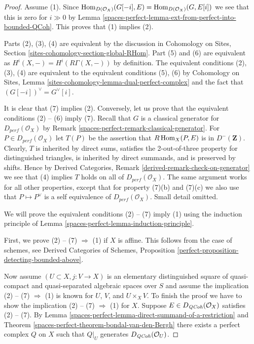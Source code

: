 \begin{proof}
Assume (1). Since
$\operatorname{Hom}_{D(\mathcal{O}_X)}(G[-i], E) = \operatorname{Hom}_{D(\mathcal{O}_X)}(G, E[i])$
we see that this is zero for $i \gg 0$ by
Lemma \ref{spaces-perfect-lemma-ext-from-perfect-into-bounded-QCoh}. This proves
that (1) implies (2).

\medskip\noindent
Parts (2), (3), (4) are equivalent by the discussion in
Cohomology on Sites, Section \ref{sites-cohomology-section-global-RHom}.
Part (5) and (6) are equivalent as $H^i(X, -) = H^i(R\Gamma(X, -))$
by definition. The equivalent conditions (2), (3), (4) are
equivalent to the equivalent conditions (5), (6) by
Cohomology on Sites, Lemma \ref{sites-cohomology-lemma-dual-perfect-complex}
and the fact that $(G[-i])^\vee = G^\vee[i]$.

\medskip\noindent
It is clear that (7) implies (2). Conversely,
let us prove that the equivalent conditions (2) -- (6) imply (7).
Recall that $G$ is a  classical generator for $D_{perf}(\mathcal{O}_X)$ by
Remark \ref{spaces-perfect-remark-classical-generator}.
For $P \in D_{perf}(\mathcal{O}_X)$ let $T(P)$ be the assertion that
$R\operatorname{Hom}_X(P, E)$ is in $D^-(\mathbf{Z})$.
Clearly, $T$ is inherited by direct sums,
satisfies the 2-out-of-three property for distinguished
triangles, is inherited by direct summands, and is preserved by shifts.
Hence by Derived Categories, Remark \ref{derived-remark-check-on-generator}
we see that (4) implies $T$ holds on all of $D_{perf}(\mathcal{O}_X)$.
The same argument works for all other properties, except that for property
(7)(b) and (7)(c) we also use that $P \mapsto P^\vee$ is a self
equivalence of $D_{perf}(\mathcal{O}_X)$. Small detail omitted.

\medskip\noindent
We will prove the equivalent conditions (2) -- (7) imply (1)
using the induction principle of
Lemma \ref{spaces-perfect-lemma-induction-principle}.

\medskip\noindent
First, we prove (2) -- (7) $\Rightarrow$ (1) if $X$ is affine.
This follows from the case of schemes, see
Derived Categories of Schemes, Proposition
\ref{perfect-proposition-detecting-bounded-above}.

\medskip\noindent
Now assume $(U \subset X, j : V \to X)$ is an elementary distinguished
square of quasi-compact and quasi-separated algebraic spaces over $S$
and assume the implication (2) -- (7) $\Rightarrow$ (1)
is known for $U$, $V$, and $U \times_X V$. To finish the proof
we have to show the implication (2) -- (7) $\Rightarrow$ (1) for $X$.
Suppose $E \in D_{\mathit{QCoh}}(\mathcal{O}_X)$ satisfies (2) -- (7).
By Lemma \ref{spaces-perfect-lemma-direct-summand-of-a-restriction} and
Theorem \ref{spaces-perfect-theorem-bondal-van-den-Bergh} there exists a perfect
complex $Q$ on $X$ such that $Q|_U$ generates $D_{\mathit{QCoh}} (\mathcal{O}_U)$.


\end{proof}
